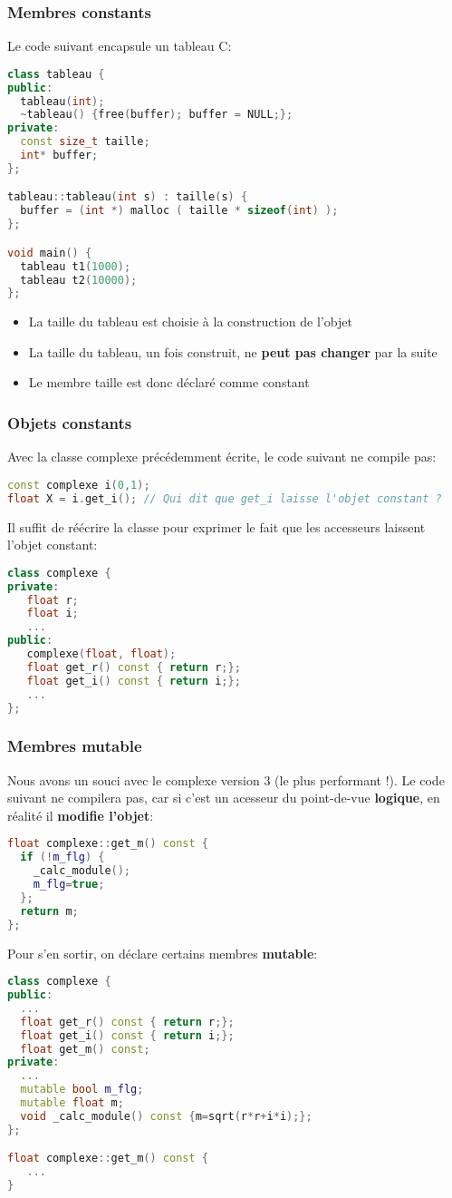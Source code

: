 \documentclass{beamer}
\begin{document}
\begin{frame}[fragile=singleslide,shrink=20]
\frametitle {Membres constants}
Le code suivant encapsule un tableau C:
\begin{lstlisting}[language=c++]
class tableau {
public:
  tableau(int);
  ~tableau() {free(buffer); buffer = NULL;};
private:
  const size_t taille;
  int* buffer;
};

tableau::tableau(int s) : taille(s) {
  buffer = (int *) malloc ( taille * sizeof(int) );
};

void main() {
  tableau t1(1000);
  tableau t2(10000);
};
\end{lstlisting}

\begin{itemize}
\item{La taille du tableau est choisie à la construction de l'objet}
\item{La taille du tableau, un fois construit, ne \textbf{peut pas changer} par la suite}
\item{Le membre taille est donc déclaré comme constant}
\end{itemize}
\end{frame}

\begin{frame}[fragile=singleslide,shrink=20]
\frametitle {Objets constants}
Avec la classe complexe précédemment écrite, le code suivant ne compile pas:
\begin{lstlisting}[language=c++]
const complexe i(0,1);
float X = i.get_i(); // Qui dit que get_i laisse l'objet constant ?
\end{lstlisting}
Il suffit de réécrire la classe pour exprimer le fait que les accesseurs laissent l'objet constant:
\begin{lstlisting}[language=c++]
class complexe {
private:
   float r;
   float i;
   ...
public:
   complexe(float, float);
   float get_r() const { return r;};
   float get_i() const { return i;};
   ...
};
\end{lstlisting}
\end{frame}

\begin{frame}[fragile=singleslide,shrink=20]
\frametitle {Membres mutable}
Nous avons un souci avec le complexe version 3 (le plus performant !). Le code suivant ne compilera pas,
car si c'est un acesseur du point-de-vue \textbf{logique}, en réalité il \textbf{modifie l'objet}:
\begin{lstlisting}[language=c++]
float complexe::get_m() const {
  if (!m_flg) {
    _calc_module();
    m_flg=true;
  };
  return m;
};
\end{lstlisting}
Pour s'en sortir, on déclare certains membres \textbf{mutable}:
\begin{lstlisting}[language=c++]
class complexe {
public:
  ...
  float get_r() const { return r;};
  float get_i() const { return i;};
  float get_m() const;
private:
  ...
  mutable bool m_flg;
  mutable float m;
  void _calc_module() const {m=sqrt(r*r+i*i);};
};

float complexe::get_m() const {
   ...
}
\end{lstlisting}
\end{frame}
\end{document}
